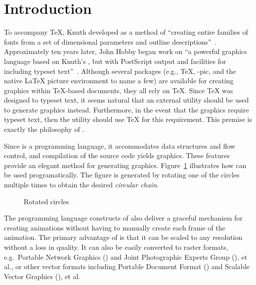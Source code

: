 \section{Introduction}
\label{sec:introduction}

\addtocounter{footnote}{1}%
To accompany \TeX{}, Knuth developed \MF{} as a method of ``creating
entire families of fonts from a set of dimensional parameters and
outline descriptions''~\cite{beebe:mf}.  Approximately ten years later,
John Hobby began work on \MP{}\Dash ``a powerful graphics language based
on Knuth's \MF, but with PostScript output and facilities for including
typeset text''~\cite{hobby:user}.  Although several packages (e.g.,
\PiC\TeX, \Xy-pic, and the native \LaTeX{} picture environment to name a
few) are available for creating graphics within \TeX-based documents,
they all rely on \TeX{}.  Since \TeX{} was designed to typeset text, it
seems natural that an external utility should be used to generate
graphics instead.  Furthermore, in the event that the graphics require
typeset text, then the utility should use \TeX{} for this requirement.
This premise is exactly the philosophy of \MP.

Since \MP{} is a programming language, it accommodates data structures
and flow control, and compilation of the \MP{} source code yields \EPS{}
graphics.  These features provide an elegant method for generating
graphics.  Figure~\ref{fig:circles} illustrates how \MP{} can be used
programatically.  The figure is generated by rotating one of the circles
multiple times to obtain the desired \textit{circular chain}.

\begin{figure}[hptb]
  \begin{center}
  \end{center}
	\caption{Rotated circles}
  \label{fig:circles}
\end{figure}

The programming language constructs of \MP{} also deliver a graceful mechanism for creating animations without having to manually create each frame of the animation.  The primary advantage of \EPS{} is that it can be scaled to any resolution without a loss in quality.  It can also be easily converted to raster formats, e.g.\ Portable Network Graphics (\PNG) and Joint Photographic Experts Group (\JPEG), et al., or other vector formats including Portable Document Format (\PDF) and Scalable Vector Graphics (\SVG), et al.
